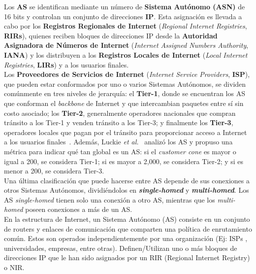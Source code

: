 Los \textbf{AS} se identifican mediante un número de \textbf{Sistema Autónomo (ASN)} de 16 bits y controlan un conjunto de direcciones \textbf{IP}. 
Esta asignación es llevada a cabo por los \textbf{Registros Regionales de Internet} (\textit{Regional Internet Registries}, \textbf{RIRs}), quienes reciben bloques de direcciones IP desde la \textbf{Autoridad Asignadora de Números de Internet} (\textit{Internet Assigned Numbers Authority}, \textbf{IANA}) y los distribuyen a los \textbf{Registros Locales de Internet} (\textit{Local Internet Registries}, \textbf{LIRs}) y a los usuarios finales.\\

Los \textbf{Proveedores de Servicios de Internet} (\textit{Internet Service Providers}, \textbf{ISP}), que pueden estar conformados por uno o varios Sistemas Autónomos, se dividen comúnmente en tres niveles de jerarquía:  
el \textbf{Tier-1}, donde se encuentran los AS que conforman el \textit{backbone} de Internet y que intercambian paquetes entre sí sin costo asociado;  
los \textbf{Tier-2}, generalmente operadores nacionales que compran tránsito a los Tier-1 y venden tránsito a los Tier-3;  
y finalmente los \textbf{Tier-3}, operadores locales que pagan por el tránsito para proporcionar acceso a Internet a los usuarios finales~\cite{InterconnectionPeeringSettlements}.  
Además, Luckie \textit{et al.}~\cite{ASRank} analizó los AS y propuso una métrica para indicar qué tan global es un AS:  
si el \textit{customer cone} es mayor o igual a 200, se considera Tier-1;  
si es mayor a 2,000, se considera Tier-2;  
y si es menor a 200, se considera Tier-3.\\

Una última clasificación que puede hacerse entre AS depende de sus conexiones a otros Sistemas Autónomos, dividiéndolos en \textbf{\textit{single-homed}} y \textbf{\textit{multi-homed}}.  
Los AS \textit{single-homed} tienen solo una conexión a otro AS, mientras que los \textit{multi-homed} poseen conexiones a más de un AS.\\



En la estructura de Internet, un Sistema Autónomo (AS) consiste en un conjunto de routers y enlaces de comunicación que comparten una política de enrutamiento común. Estos son operados independientemente por una organización (Ej: ISPs , universidades, empresas, entre otras). Definen/Utilizan uno o más bloques de direcciones IP que le han sido asignados por un RIR (Regional Internet Registry) o NIR. 

